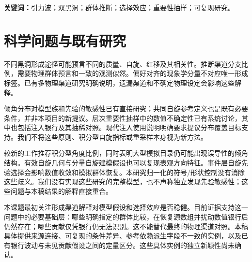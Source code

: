 \begin{abstract}
我们研究双黑洞群体中的哪些指定比较，能够经受后验表示、选择银行表示和有限数值积分的变化。对固定的\DataEvents{}个公开事件，恢复了分析来源和原始先验后验，共\DataRows{}行。每事件选择一套Phenom族分析，不假设全目录配置完全相同。我们分别传播六个原生倾角模型和六个负有效自旋控制模型。后者的双星总体比例$g=P(\ceff<0)$在匹配滤波口径下的中位数为13.29\%至28.66\%，各模型90\%可信区间明显重叠。同一角度形状下，改变自旋幅度族使中位数相差12.10--14.34个百分点。这三项差异在\DataReplicates{}次成对人工事件/注入抽稀中均为正，而接近零的一项原生倾角差会变号。我们进一步将这种有限银行稳定性与缺失支持不确定性分开：声明的单事件积分补入族，在极限情形下可使部分$g$中位数移动最多\DataCompletionMax{}个百分点，但样本并未测出补入量。我们推导未知对数似然修正有界时的条件后验包络，并量化幅度排序的充分保证何时失效。仅凭检出概率上界，无法认证O3已知支持外贡献可忽略。这些结果构成可复查的条件研究与数值验证，不是天体物理形成渠道比例测量，也不是实际活动覆盖率校准。
\end{abstract}
\noindent\textbf{关键词：}引力波；双黑洞；群体推断；选择效应；重要性抽样；可复现研究。

\section{科学问题与既有研究}
不同黑洞形成途径可能预言不同的质量、自旋、红移及其相关性。推断渠道分支比例，需要物理群体预言和一致的观测似然。偏好对齐的现象学分量不对应唯一形成标签。已有多物理渠道研究明确说明，遗漏渠道和不确定物理设定会影响这些解释\cite{zevin}。

倾角分布对模型族和先验的敏感性已有直接研究\cite{spinlike}；共同自旋参考定义也是既有必要条件\cite{infinity}，并非本项目的新提议。层次重要性抽样中的数值不确定性已有系统讨论\cite{growing}，其中也包括注入银行及其抽稀对照\cite{structure}。现代注入使用说明明确要求提议分布覆盖目标支持\cite{injections}。我们不将这些原则、积分型自旋指标或重采样本身视为新方法。

较新的工作推荐积分型角度比例，同时表明大型模拟目录仍可能出现误导性的倾角结构\cite{longroad}。有效自旋几何与分量自旋建模假设也可以复现表观方向特征\cite{degeneracies}。事件层自旋先验选择会影响数值收敛和模拟群体恢复\cite{spinpriors}。本研究归一化的符号/形状控制没有消除这些歧义。我们没有实现这些研究的完整模型，也不声称独立发现先验敏感性；这些问题与本稿结果的解释直接重合。

本课题最初关注形成渠道解释对模型假设和选择效应是否稳健。目前证据支持这一问题中的必要基础层：哪些明确指定的群体比较，在恢复源数组并扰动数值银行后仍然存在；哪些贡献仅凭银行仍无法识别。这不能替代最终的物理渠道对照。本稿具体提供来源连接、可复现的条件差异、参考依赖派生字段不一致的实例，以及已有银行波动与未见贡献假设之间的定量区分。这些具体实例的独立新颖性尚未确认。

